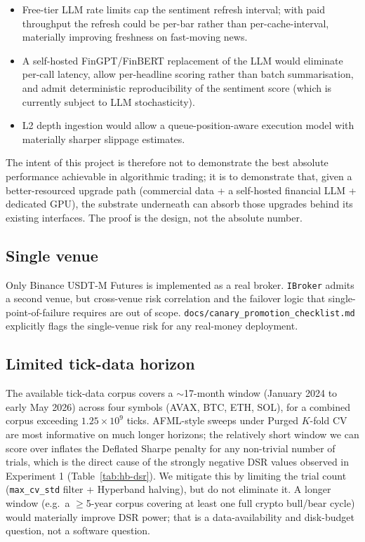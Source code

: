 \documentclass[a4paper, 12pt, titlepage]{article}
\begin{document}
\begin{itemize}[noitemsep]
    \item Free-tier LLM rate limits cap the sentiment refresh
    interval; with paid throughput the refresh could be per-bar
    rather than per-cache-interval, materially improving freshness
    on fast-moving news.
    \item A self-hosted FinGPT/FinBERT replacement of the LLM would
    eliminate per-call latency, allow per-headline scoring rather
    than batch summarisation, and admit deterministic reproducibility
    of the sentiment score (which is currently subject to LLM
    stochasticity).
    \item L2 depth ingestion would allow a queue-position-aware
    execution model with materially sharper slippage estimates.
\end{itemize}

The intent of this project is therefore not to demonstrate the best
absolute performance achievable in algorithmic trading; it is to
demonstrate that, given a better-resourced upgrade path
(commercial data + a self-hosted financial LLM + dedicated GPU), the
substrate underneath can absorb those upgrades behind its existing
interfaces. The proof is the design, not the absolute number.

\subsection*{Single venue}

Only Binance USDT-M Futures is implemented as a real broker.
\texttt{IBroker} admits a second venue, but cross-venue risk
correlation and the failover logic that single-point-of-failure
requires are out of scope. \texttt{docs/canary\_promotion\_checklist.md}
explicitly flags the single-venue risk for any real-money
deployment.

\subsection*{Limited tick-data horizon}

The available tick-data corpus covers a $\sim$17-month window
(January 2024 to early May 2026) across four symbols (AVAX, BTC,
ETH, SOL), for a combined corpus exceeding $1.25\times 10^9$ ticks.
AFML-style sweeps under Purged $K$-fold CV are most informative on
much longer horizons; the relatively short window we can score
over inflates the Deflated Sharpe penalty for any non-trivial
number of trials, which is the direct cause of the strongly
negative DSR values observed in Experiment 1
(Table~\ref{tab:hb-dsr}). We mitigate this by limiting the trial
count (\texttt{max\_cv\_std} filter + Hyperband halving), but do
not eliminate it. A longer window (e.g.\ a $\geq$5-year corpus
covering at least one full crypto bull/bear cycle) would
materially improve DSR power; that is a data-availability and
disk-budget question, not a software question.
\end{document}
